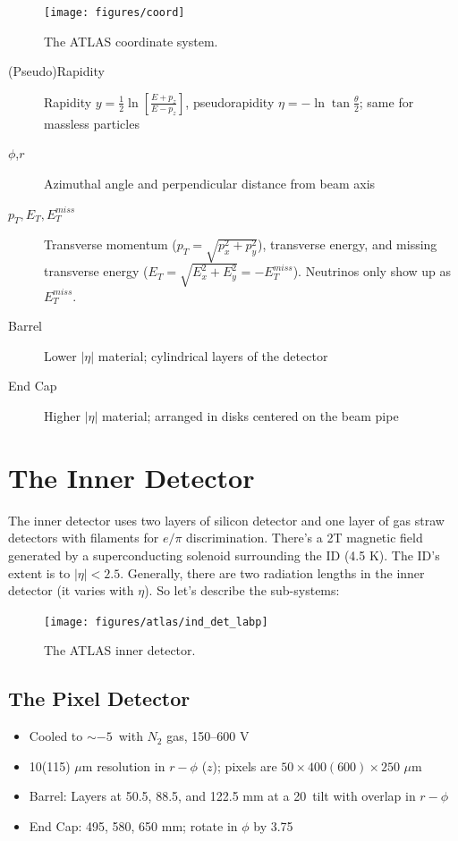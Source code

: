\begin{figure}[!htbp]\captionsetup{justification=centering}
  \centering
  \texttt{[image: figures/coord]}
  \caption{The  ATLAS coordinate system.}
  \label{fig:acoord}
\end{figure}
\begin{description}
\item[(Pseudo)Rapidity] Rapidity $y=\frac{1}{2}\ln\left[\frac{E+p_z}{E-p_z}\right]$, pseudorapidity $\eta=-\ln\tan\frac{\theta}{2}$; same for massless particles
\item[$\phi$,$r$] Azimuthal angle and perpendicular distance from beam axis
\item[$p_T,E_T,E^{miss}_T$] Transverse momentum ($p_T=\sqrt{p_x^2+p_y^2}$), transverse energy, and missing transverse energy ($E_T=\sqrt{E_x^2+E_y^2}=-E_T^{miss}$).  Neutrinos only show up as $E_T^{miss}$.
\item[Barrel] Lower $\left|\eta\right|$ material; cylindrical layers of the detector
\item[End Cap] Higher $\left|\eta\right|$ material; arranged in disks centered on the beam pipe
\end{description}


\section{The Inner Detector}
The inner detector uses two layers of silicon detector and one layer of gas straw detectors with filaments for $e/\pi$ discrimination.  There's a 2T magnetic field generated by a superconducting solenoid surrounding the ID (4.5 K).  The ID's extent is to $\left|\eta\right|<2.5$.  Generally, there are two radiation lengths in the inner detector (it varies with $\eta$). So let's describe the sub-systems:
\begin{figure}[!htbp]\captionsetup{justification=centering}
  \centering
  \texttt{[image: figures/atlas/ind\_det\_labp]}
  \caption{The ATLAS inner detector.}
  \label{fig:indet}
\end{figure}
\subsection{The Pixel Detector}
\begin{itemize}
\item Cooled to $\sim-5$\celsius\  with $N_2$ gas, 150--600 V
\item 10(115) $\mu$m resolution in $r-\phi$ ($z$); pixels are $50\times400(600)\times250$ $\mu$m
\item Barrel: Layers at 50.5, 88.5, and 122.5 mm at a 20\degree\ tilt with overlap in $r-\phi$
\item End Cap: 495, 580, 650 mm; rotate in $\phi$ by 3.75\degree\
\end{itemize}
